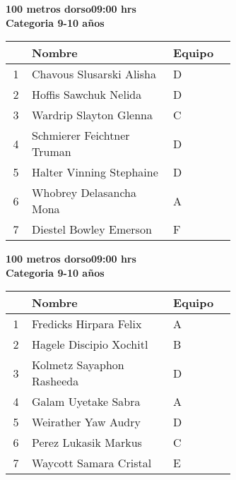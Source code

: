 \begin{minipage}{0.95\linewidth}\vspace{0.5cm} 
\begin{flushleft}
\textbf{
\hspace{-0.15cm}100 metros dorso\hspace{1.5cm}09:00 hrs \\Categoria 9-10 años}\vspace{-0.2cm} 
\end{flushleft}
\begin{tabular}{cp{0.63\linewidth}l}
\hline
& \textbf{Nombre} & \textbf{Equipo} \\ \hline
1 & Chavous Slusarski Alisha & D \\ 
2 & Hoffis Sawchuk Nelida & D \\ 
3 & Wardrip Slayton Glenna & C \\ 
4 & Schmierer Feichtner Truman & D \\ 
5 & Halter Vinning Stephaine & D \\ 
6 & Whobrey Delasancha Mona & A \\ 
7 & Diestel Bowley Emerson & F \\ 
\end{tabular}
\end{minipage}
\begin{minipage}{0.95\linewidth}\vspace{0.5cm} 
\begin{flushleft}
\textbf{
\hspace{-0.15cm}100 metros dorso\hspace{1.5cm}09:00 hrs \\Categoria 9-10 años}\vspace{-0.2cm} 
\end{flushleft}
\begin{tabular}{cp{0.63\linewidth}l}
\hline
& \textbf{Nombre} & \textbf{Equipo} \\ \hline
1 & Fredicks Hirpara Felix & A \\ 
2 & Hagele Discipio Xochitl & B \\ 
3 & Kolmetz Sayaphon Rasheeda & D \\ 
4 & Galam Uyetake Sabra & A \\ 
5 & Weirather Yaw Audry & D \\ 
6 & Perez Lukasik Markus & C \\ 
7 & Waycott Samara Cristal & E \\ 
\end{tabular}
\end{minipage}

